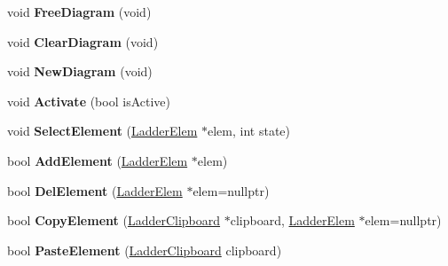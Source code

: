 \begin{DoxyCompactItemize}
\item 
\hypertarget{class_ladder_diagram_acfb0e7b5fb3ef36a1256c37dd88e7b28}{void {\bfseries Free\-Diagram} (void)}\label{class_ladder_diagram_acfb0e7b5fb3ef36a1256c37dd88e7b28}

\item 
\hypertarget{class_ladder_diagram_aec82ac7ac9e57612ee660bcb3174b147}{void {\bfseries Clear\-Diagram} (void)}\label{class_ladder_diagram_aec82ac7ac9e57612ee660bcb3174b147}

\item 
\hypertarget{class_ladder_diagram_a7821f02a13077d0b85d87481e251e869}{void {\bfseries New\-Diagram} (void)}\label{class_ladder_diagram_a7821f02a13077d0b85d87481e251e869}

\item 
\hypertarget{class_ladder_diagram_ae55ee99861de5acd7a5fb80ffaf89ef6}{void {\bfseries Activate} (bool is\-Active)}\label{class_ladder_diagram_ae55ee99861de5acd7a5fb80ffaf89ef6}

\item 
\hypertarget{class_ladder_diagram_a59dc32550ac5e29085b440e9f0798060}{void {\bfseries Select\-Element} (\hyperlink{class_ladder_elem}{Ladder\-Elem} $\ast$elem, int state)}\label{class_ladder_diagram_a59dc32550ac5e29085b440e9f0798060}

\item 
\hypertarget{class_ladder_diagram_ad03ae0f17edb1b582492370917721ef5}{bool {\bfseries Add\-Element} (\hyperlink{class_ladder_elem}{Ladder\-Elem} $\ast$elem)}\label{class_ladder_diagram_ad03ae0f17edb1b582492370917721ef5}

\item 
\hypertarget{class_ladder_diagram_ade22ce172477a8532c69e785238f8e40}{bool {\bfseries Del\-Element} (\hyperlink{class_ladder_elem}{Ladder\-Elem} $\ast$elem=nullptr)}\label{class_ladder_diagram_ade22ce172477a8532c69e785238f8e40}

\item 
\hypertarget{class_ladder_diagram_a3099b8c53d167759c5d0ca202e25f526}{bool {\bfseries Copy\-Element} (\hyperlink{struct_ladder_clipboard}{Ladder\-Clipboard} $\ast$clipboard, \hyperlink{class_ladder_elem}{Ladder\-Elem} $\ast$elem=nullptr)}\label{class_ladder_diagram_a3099b8c53d167759c5d0ca202e25f526}

\item 
\hypertarget{class_ladder_diagram_a4ea2aa6d914eaf440b996ce6f1e51764}{bool {\bfseries Paste\-Element} (\hyperlink{struct_ladder_clipboard}{Ladder\-Clipboard} clipboard)}\label{class_ladder_diagram_a4ea2aa6d914eaf440b996ce6f1e51764}


\end{DoxyCompactItemize}
